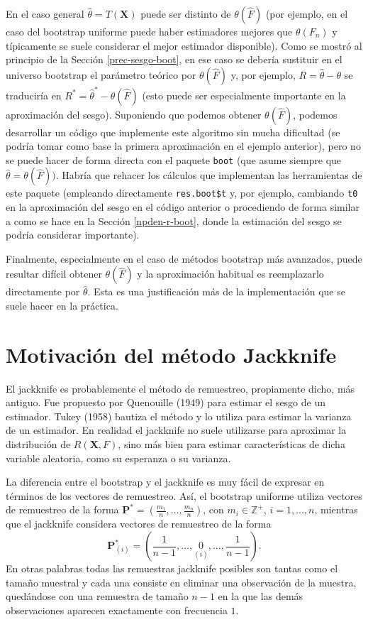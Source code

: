 \documentclass[
]{book}
\theoremstyle{break}
\theoremstyle{definition}
\theoremstyle{definition}
\theoremstyle{definition}
\theoremstyle{definition}
\theoremstyle{remark}
\begin{document}
En el caso general \(\hat\theta = T\left( \mathbf{X} \right)\) puede ser distinto de \(\theta ( \hat{F} )\) (por ejemplo, en el caso del bootstrap uniforme puede haber estimadores mejores que \(\theta( F_n)\) y típicamente se suele considerar el mejor estimador disponible).
Como se mostró al principio de la Sección \ref{prec-sesgo-boot}, en ese caso se debería sustituir en el universo bootstrap el parámetro teórico por \(\theta ( \hat{F} )\) y, por ejemplo, \(R = \hat \theta - \theta\) se traduciría en \(R^{\ast} = \hat \theta^{\ast} - \theta ( \hat{F} )\) (esto puede ser especialmente importante en la aproximación del sesgo).
Suponiendo que podemos obtener \(\theta ( \hat{F} )\), podemos desarrollar un código que implemente este algoritmo sin mucha dificultad (se podría tomar como base la primera aproximación en el ejemplo anterior), pero no se puede hacer de forma directa con el paquete \texttt{boot} (que asume siempre que \(\hat\theta = \theta ( \hat{F} ))\).
Habría que rehacer los cálculos que implementan las herramientas de este paquete (empleando directamente \texttt{res.boot\$t} y, por ejemplo, cambiando \texttt{t0} en la aproximación del sesgo en el código anterior o procediendo de forma similar a como se hace en la Sección \ref{npden-r-boot}, donde la estimación del sesgo se podría considerar importante).

Finalmente, especialmente en el caso de métodos bootstrap más avanzados, puede resultar difícil obtener \(\theta ( \hat{F} )\) y la aproximación habitual es reemplazarlo directamente por \(\hat \theta\).
Esta es una justificación más de la implementación que se suele hacer en la práctica.

\hypertarget{jackknife}{%
\section{Motivación del método Jackknife}\label{jackknife}}

El jackknife es probablemente el método de remuestreo, propiamente
dicho, más antiguo. Fue propuesto por Quenouille (1949) para estimar el
sesgo de un estimador. Tukey (1958) bautiza el método y lo utiliza para
estimar la varianza de un estimador. En realidad el jackknife no suele
utilizarse para aproximar la distribución de \(R\left( \mathbf{X},F \right)\),
sino más bien para estimar características de dicha
variable aleatoria, como su esperanza o su varianza.

La diferencia entre el bootstrap y el jackknife es muy fácil de expresar
en términos de los vectores de remuestreo. Así, el bootstrap uniforme
utiliza vectores de remuestreo de la forma
\(\mathbf{P}^{\ast}=\left( \frac{m_1}{n},\ldots ,\frac{m_n}{n} \right)\), con
\(m_i\in \mathbb{Z}^{+}\), \(i=1,\ldots ,n\), mientras que el jackknife considera
vectores de remuestreo de la forma
\[\mathbf{P}_{(i)}^{\ast}=\left( \frac{1}{n-1},\ldots ,\underset{(i)}{0}
,\ldots ,\frac{1}{n-1} \right).\]
En otras palabras todas las remuestras
jackknife posibles son tantas como el tamaño muestral y cada una
consiste en eliminar una observación de la muestra, quedándose con una
remuestra de tamaño \(n-1\) en la que las demás observaciones aparecen
exactamente con frecuencia \(1\).
\end{document}
